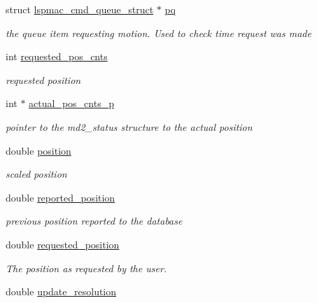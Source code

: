 \begin{DoxyCompactItemize}
struct \hyperlink{structlspmac__cmd__queue__struct}{lspmac\_\-cmd\_\-queue\_\-struct} $\ast$ \hyperlink{structlspmac__motor__struct_ae0a0c9264f49f51bf72168c3b62f8723}{pq}
\begin{DoxyCompactList}\small\item\em the queue item requesting motion. Used to check time request was made \item\end{DoxyCompactList}\item 
int \hyperlink{structlspmac__motor__struct_a6e8dc9c11dc52a439fe9837230f93ce2}{requested\_\-pos\_\-cnts}
\begin{DoxyCompactList}\small\item\em requested position \item\end{DoxyCompactList}\item 
int $\ast$ \hyperlink{structlspmac__motor__struct_a312047bb71def5cd2443fecd875eaea5}{actual\_\-pos\_\-cnts\_\-p}
\begin{DoxyCompactList}\small\item\em pointer to the md2\_\-status structure to the actual position \item\end{DoxyCompactList}\item 
double \hyperlink{structlspmac__motor__struct_af8ffb3aed907d8664b65b37601954411}{position}
\begin{DoxyCompactList}\small\item\em scaled position \item\end{DoxyCompactList}\item 
double \hyperlink{structlspmac__motor__struct_ae5f1f605a0f587500e627332ad4e5e7e}{reported\_\-position}
\begin{DoxyCompactList}\small\item\em previous position reported to the database \item\end{DoxyCompactList}\item 
double \hyperlink{structlspmac__motor__struct_af8cdc94c6e2478b12ce942d4cf1d7499}{requested\_\-position}
\begin{DoxyCompactList}\small\item\em The position as requested by the user. \item\end{DoxyCompactList}\item 
double \hyperlink{structlspmac__motor__struct_a18386126b724d9c7f72364db126f5b93}{update\_\-resolution}

\end{DoxyCompactItemize}
